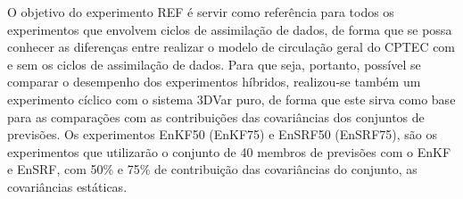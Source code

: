 O objetivo do experimento REF é servir como referência para todos os experimentos que envolvem ciclos de assimilação de dados, de forma que se possa conhecer as diferenças entre realizar o modelo de circulação geral do CPTEC com e sem os ciclos de assimilação de dados. Para que seja, portanto, possível se comparar o desempenho dos experimentos híbridos, realizou-se também um experimento cíclico com o sistema 3DVar puro, de forma que este sirva como base para as comparações com as contribuições das covariâncias dos conjuntos de previsões. Os experimentos EnKF50 (EnKF75) e EnSRF50 (EnSRF75), são os experimentos que utilizarão o conjunto de 40 membros de previsões com o EnKF e EnSRF, com 50\% e 75\% de contribuição das covariâncias do conjunto, as covariâncias estáticas.